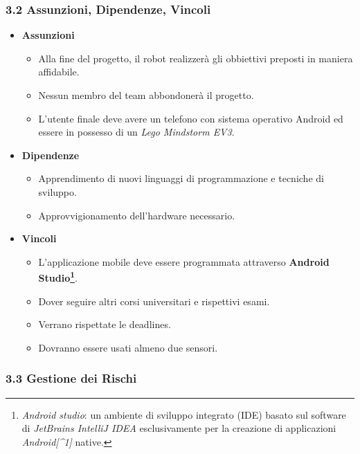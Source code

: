 \documentclass[]{article}
\providecommand{\tightlist}{%
  \setlength{\itemsep}{0pt}\setlength{\parskip}{0pt}}
\begin{document}
\hypertarget{assunzioni-dipendenze-vincoli}{%
\subsubsection{3.2 Assunzioni, Dipendenze,
Vincoli}\label{assunzioni-dipendenze-vincoli}}

\begin{itemize}
\tightlist
\item
  \textbf{Assunzioni}

  \begin{itemize}
  \tightlist
  \item
    Alla fine del progetto, il robot realizzerà gli obbiettivi preposti
    in maniera affidabile.
  \item
    Nessun membro del team abbondonerà il progetto.
  \item
    L'utente finale deve avere un telefono con sistema operativo Android
    ed essere in possesso di un \emph{Lego Mindstorm EV3}.
  \end{itemize}
\item
  \textbf{Dipendenze}

  \begin{itemize}
  \tightlist
  \item
    Apprendimento di nuovi linguaggi di programmazione e tecniche di
    sviluppo.
  \item
    Approvvigionamento dell'hardware necessario.
  \end{itemize}
\item
  \textbf{Vincoli}

  \begin{itemize}
  \tightlist
  \item
    L'applicazione mobile deve essere programmata attraverso
    \textbf{Android Studio\footnote{\emph{Android studio}: un ambiente
      di sviluppo integrato (IDE) basato sul software di \emph{JetBrains
      IntelliJ IDEA} esclusivamente per la creazione di applicazioni
      \emph{Android{[}\^{}1{]}} native.}}.
  \item
    Dover seguire altri corsi universitari e rispettivi esami.
  \item
    Verrano rispettate le deadlines.
  \item
    Dovranno essere usati almeno due sensori.
  \end{itemize}
\end{itemize}

\hypertarget{gestione-dei-rischi}{%
\subsubsection{3.3 Gestione dei Rischi}\label{gestione-dei-rischi}}
\end{document}
